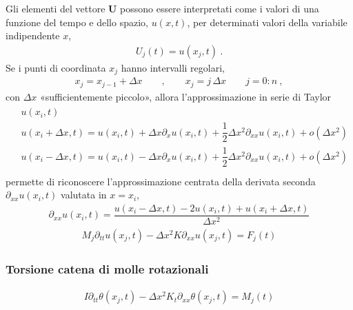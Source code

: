 \documentclass[letterpaper,10pt,italian]{jupyterBook}
\begin{document}
\sphinxAtStartPar
{} Gli elementi del vettore \(\mathbf{U}\) possono essere interpretati come i valori di una funzione del tempo e dello spazio, \(u(x,t)\), per determinati valori della variabile indipendente \(x\),
\begin{equation*}
\begin{split}U_j(t) = u(x_j, t) \ .\end{split}
\end{equation*}
\sphinxAtStartPar
Se i punti di coordinata \(x_j\) hanno intervalli regolari,
\begin{equation*}
\begin{split}x_j = x_{j-1} + \Delta x \qquad , \qquad x_j = j \, \Delta x \qquad j = 0:n \ ,\end{split}
\end{equation*}
\sphinxAtStartPar
con \(\Delta x\) «sufficientemente piccolo», allora l’approssimazione in serie di Taylor
\begin{equation*}
\begin{split}\begin{aligned}
  & u(x_i,t) \\
  & u(x_i+\Delta x, t) = u(x_i,t) + \Delta x \partial_x u(x_i,t) + \dfrac{1}{2} \Delta x^2 \partial_{xx} u(x_i,t) + o(\Delta x^2) \\
  & u(x_i-\Delta x, t) = u(x_i,t) - \Delta x \partial_x u(x_i,t) + \dfrac{1}{2} \Delta x^2 \partial_{xx} u(x_i,t) + o(\Delta x^2) \\
\end{aligned}\end{split}
\end{equation*}
\sphinxAtStartPar
permette di riconoscere l’approssimazione centrata della derivata seconda \(\partial_{xx} u(x_i, t)\) valutata in \(x = x_i\),
\begin{equation*}
\begin{split}\partial_{xx} u(x_i,t) = \dfrac{u(x_i-\Delta x,t) - 2 u(x_i,t) + u(x_i+\Delta x,t)}{\Delta x^2}\end{split}
\end{equation*}\begin{equation*}
\begin{split}M_j \partial_{tt} u(x_j,t) - \Delta x^2 K \partial_{xx} u(x_j,t) = F_j(t) \end{split}
\end{equation*}

\subsubsection{Torsione \sphinxhyphen{} catena di molle rotazionali}
\label{\detokenize{ch/waves/intro:torsione-catena-di-molle-rotazionali}}\label{\detokenize{ch/waves/intro:physics-hs-waves-equation-examples-mechanics-torsion}}\begin{equation*}
\begin{split}I \partial_{tt} \theta(x_j,t) - \Delta x^2 K_t \partial_{xx} \theta(x_j,t) = M_j(t)\end{split}
\end{equation*}
\end{document}
